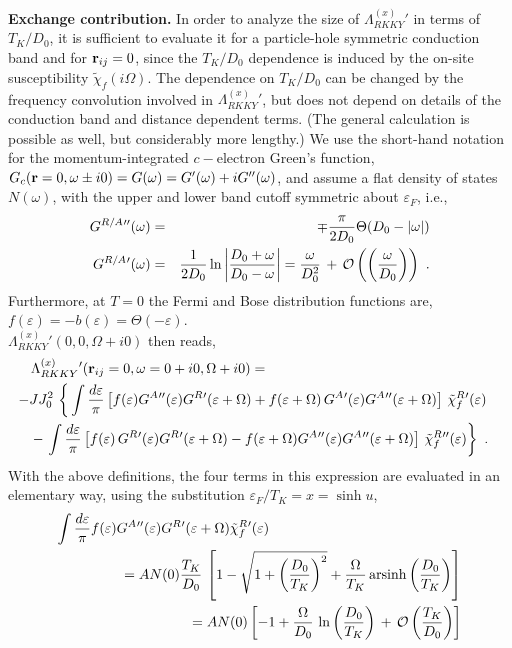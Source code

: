 \documentclass[12pt,twoside]{article}
\begin{document}
{\bf Exchange contribution.}
In order to analyze the size of $\Lambda^{(x)}_{RKKY}{'}$ in terms of 
$T_K/D_0$, it is sufficient to evaluate it for a particle-hole symmetric 
conduction band and for ${\bf r}_{ij}=0$, since  
the $T_K/D_0$ dependence is induced by the on-site susceptibility
$\tilde\chi_f(i\Omega)$. The dependence on $T_K/D_0$ can be changed by 
the frequency convolution involved in $\Lambda^{(x)}_{RKKY}{'}$, but does not 
depend on details of the conduction band and distance dependent 
terms. (The general calculation is possible as well, but considerably 
more lengthy.)    
We use the short-hand notation for the momentum-integrated
$c-$electron Green's function,
$G_c({\bf r}=0,\omega \pm i0)=G(\omega)=G'(\omega)+iG''(\omega)$, and
assume a flat density of states $N(\omega)$, with the upper and lower
band cutoff symmetric about $\varepsilon_F$, i.e., 
\begin{eqnarray}
G^{R/A}{''}(\omega) &=& \mp \frac{\pi}{2D_0}\Theta(D_0-|\omega|)\\
G^{R/A}{'}(\omega)  &=& \frac{1}{2D_0} 
\ln\left|\frac{D_0+\omega}{D_0-\omega}\right| = \frac{\omega}{D_0^2} 
\,+\,{\cal O}\left( \left(\frac{\omega}{D_0}\right) \right) \ .
\end{eqnarray}   
Furthermore, at $T=0$ the Fermi and Bose distribution functions are,
$f(\varepsilon)=-b(\varepsilon)=\Theta(-\varepsilon)$.\\
$\Lambda^{(x)}_{RKKY}{'}(0,0,\Omega+i0)$ then reads, 
\begin{eqnarray}
\Lambda^{(x)}_{RKKY}{'}({\bf r}_{ij}=0,\omega=0+i0,\Omega+i0) &=& \nonumber \\ 
&& \hspace*{-7.3cm}- JJ_0^2 \, \left\{  
\,\int \frac{d\varepsilon}{\pi}
\left[
f(\varepsilon) G^A{''}(\varepsilon)G^R{'}(\varepsilon+\Omega) 
+ f(\varepsilon+\Omega)\, G^A{'}(\varepsilon)G^A{''}(\varepsilon+\Omega)
\right] \, \tilde\chi_f^R{'}(\varepsilon) \right.
 \label{eq:Lambda_x}\\
&& \hspace*{-6.25cm}
\left. -\,\int \frac{d\varepsilon}{\pi}
\left[
f(\varepsilon)\, G^R{'}(\varepsilon)G^R{'}(\varepsilon+\Omega) 
- f(\varepsilon+\Omega) G^A{''}(\varepsilon)G^A{''}(\varepsilon+\Omega)
\right] \, \tilde\chi_f^R{''}(\varepsilon) \right\}
\nonumber \ .
\end{eqnarray}
With the above definitions, the four terms in this expression are evaluated 
in an elementary way, using the substitution $\varepsilon_F/T_K=x=\sinh u$,
\begin{eqnarray}
\int \frac{d\varepsilon}{\pi}
f(\varepsilon) G^A{''}(\varepsilon)G^R{'}(\varepsilon+\Omega) 
\tilde\chi_f^R{'}(\varepsilon) && \nonumber \\ 
&&\hspace*{-4.0cm} =A N(0) \frac{T_K}{D_0}\, \left[
1-\sqrt{1+\left(\frac{D_0}{T_K}\right)^2}+
\frac{\Omega}{T_K}\, {\rm arsinh}\left(\frac{D_0}{T_K}\right)
\right] \nonumber\\
&&\hspace*{-4.0cm} =A N(0) \left[ -1 + 
\frac{\Omega}{D_0}\,  \ln\left(\frac{D_0}{T_K}\right)
\, + \, 
{\cal O}\left(\frac{T_K}{D_0}\right)
\right]
\label{eq:Lambda_x1}
\end{eqnarray}
\end{document}
